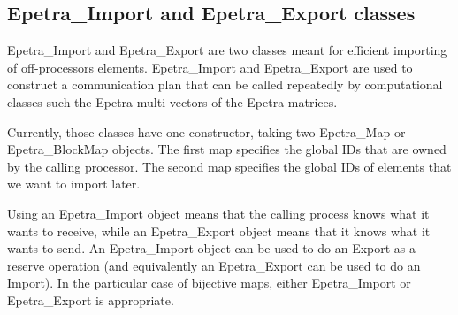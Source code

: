 
\subsection{Epetra\_Import and Epetra\_Export classes}
\label{sec:import_export}

Epetra\_Import and Epetra\_Export are two classes meant for efficient
importing of off-processors elements. Epetra\_Import and Epetra\_Export
are used to construct a communication plan that can be called repeatedly
by computational classes such the Epetra multi-vectors of the Epetra
matrices.

Currently, those classes have one constructor, taking two Epetra\_Map or
Epetra\_BlockMap objects. The first map specifies the global IDs that
are owned by the calling processor. The second map specifies the global
IDs of  elements that we want to import later.

Using an Epetra\_Import object means that the calling process knows what
it wants to receive, while an Epetra\_Export object means that it knows
what it wants to send. An Epetra\_Import object can be used to do an
Export as a reserve operation (and equivalently an Epetra\_Export can be
used to do an Import). In the particular case of bijective maps, either
Epetra\_Import or Epetra\_Export is appropriate.

\medskip

